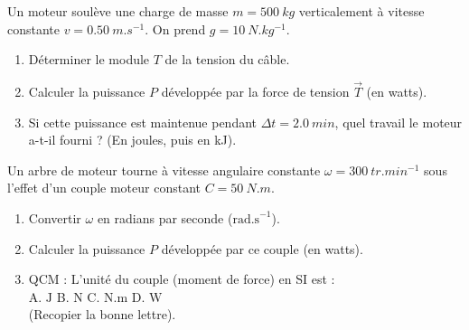 \documentclass[11pt]{article}
\begin{document}
\begin{exercice}
Un moteur soulève une charge de masse $m = \SI{500}{kg}$ verticalement à vitesse constante $v = \SI{0,50}{m.s^{-1}}$. On prend $g = \SI{10}{N.kg^{-1}}$.
\begin{enumerate}
    \item Déterminer le module $T$ de la tension du câble.
    \item Calculer la puissance $P$ développée par la force de tension $\vec{T}$ (en watts).
    \item Si cette puissance est maintenue pendant $\Delta t = \SI{2,0}{min}$, quel travail le moteur a-t-il fourni ? (En joules, puis en kJ).
\end{enumerate}
\end{exercice}

\begin{exercice}
Un arbre de moteur tourne à vitesse angulaire constante $\omega = \SI{300}{tr.min^{-1}}$ sous l'effet d'un couple moteur constant $C = \SI{50}{N.m}$.
\begin{enumerate}
    \item Convertir $\omega$ en radians par seconde ($\text{rad.s}^{-1}$).
    \item Calculer la puissance $P$ développée par ce couple (en watts).
    \item QCM : L'unité du couple (moment de force) en SI est : \\
    A. $\text{J}$ \quad B. $\text{N}$ \quad C. $\text{N.m}$ \quad D. $\text{W}$ \\
    (Recopier la bonne lettre).
\end{enumerate}
\end{exercice}
\end{document}
